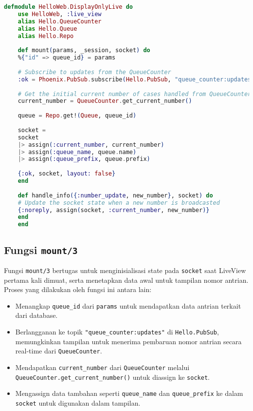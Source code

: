 \begin{lstlisting}[language=Elixir]
	defmodule HelloWeb.DisplayOnlyLive do
	use HelloWeb, :live_view
	alias Hello.QueueCounter
	alias Hello.Queue
	alias Hello.Repo
	
	def mount(params, _session, socket) do
	%{"id" => queue_id} = params
	
	# Subscribe to updates from the QueueCounter
	:ok = Phoenix.PubSub.subscribe(Hello.PubSub, "queue_counter:updates")
	
	# Get the initial current number of cases handled from QueueCounter
	current_number = QueueCounter.get_current_number()
	
	queue = Repo.get!(Queue, queue_id)
	
	socket =
	socket
	|> assign(:current_number, current_number)
	|> assign(:queue_name, queue.name)
	|> assign(:queue_prefix, queue.prefix)
	
	{:ok, socket, layout: false}
	end
	
	def handle_info({:number_update, new_number}, socket) do
	# Update the socket state when a new number is broadcasted
	{:noreply, assign(socket, :current_number, new_number)}
	end
	end
\end{lstlisting}

\subsection{Fungsi \texttt{mount/3}}
Fungsi \texttt{mount/3} bertugas untuk menginisialisasi state pada \texttt{socket} saat LiveView pertama kali dimuat, serta menetapkan data awal untuk tampilan nomor antrian. Proses yang dilakukan oleh fungsi ini antara lain:
\begin{itemize}
	\item Menangkap \texttt{queue\_id} dari \texttt{params} untuk mendapatkan data antrian terkait dari database.
	\item Berlangganan ke topik \texttt{"queue\_counter:updates"} di \texttt{Hello.PubSub}, memungkinkan tampilan untuk menerima pembaruan nomor antrian secara real-time dari \texttt{QueueCounter}.
	\item Mendapatkan \texttt{current\_number} dari \texttt{QueueCounter} melalui \texttt{QueueCounter.get\_current\_number()} untuk diassign ke \texttt{socket}.
	\item Mengassign data tambahan seperti \texttt{queue\_name} dan \texttt{queue\_prefix} ke dalam \texttt{socket} untuk digunakan dalam tampilan.
\end{itemize}

